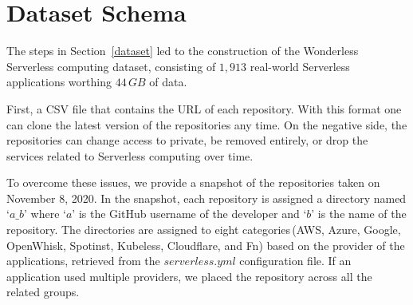 
\section{Dataset Schema}
\label{schema}

The steps in Section~\ref{dataset} led to the construction of the
 Wonderless Serverless computing dataset, consisting of $1,913$
real-world Serverless applications worthing $44 \, GB$ of data. 

First, a CSV file that contains the URL of each repository. 
With this format one can clone the latest version of the repositories any time. 
On the negative side, the repositories can change access to private, 
be removed entirely, or drop the services related to Serverless computing 
over time. 

To overcome these issues, we provide a snapshot of the 
repositories taken on November 8, 2020. 
In the snapshot, each repository is assigned a directory named `$a\_b$' 
where `$a$' is the GitHub username of the developer and `$b$' is the name of the repository. 
The directories are assigned to eight categories\,(AWS, Azure, Google, OpenWhisk, Spotinst, 
Kubeless, Cloudflare, and Fn) based on the provider of the applications,
retrieved from the $serverless.yml$ configuration file. 
If an application used multiple providers, we placed the repository across 
all the related groups. 
